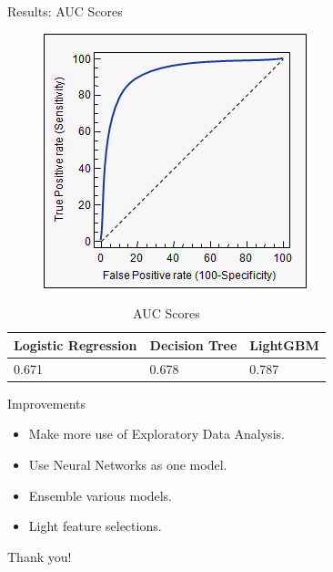 \documentclass{beamer}
\begin{document}

\begin{frame}{Results: AUC Scores}
\begin{figure}
  \includegraphics[width=0.4\linewidth]{pic/auc_scores.png}
  \label{fig:auc}
\end{figure}
\begin{table}
\begin{tabular}{l l l}
\toprule
\textbf{Logistic Regression} & \textbf{Decision Tree} & \textbf{LightGBM}\\
\midrule
0.671 & 0.678 & 0.787 \\
\bottomrule
\end{tabular}
\caption{AUC Scores}
\end{table}
\end{frame}


\begin{frame}{Improvements}
\begin{itemize}
\item Make more use of Exploratory Data Analysis. 
\item Use Neural Networks as one model. 
\item Ensemble various models.
\item Light feature selections. 
\end{itemize}

\end{frame}


\begin{frame}
\Huge{\centerline{Thank you!}}
\end{frame}

\end{document}
